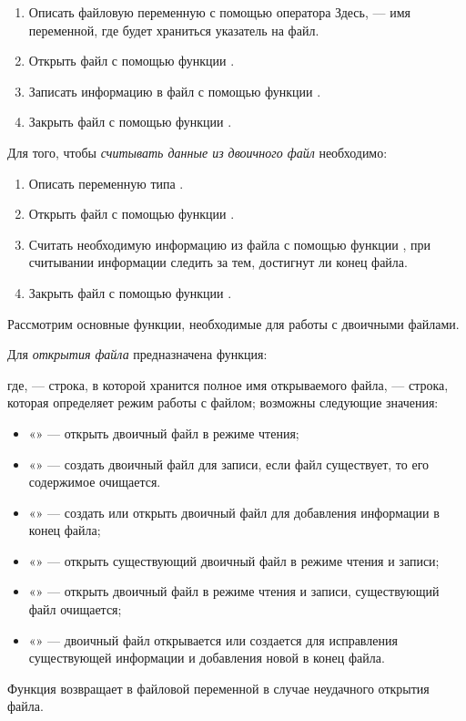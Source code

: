 \begin{enumerate}
\item Описать файловую переменную с помощью оператора
Здесь,  --- имя переменной, где будет храниться указатель на файл.
\item Открыть файл с помощью функции .
\item Записать информацию в файл с помощью функции .
\item Закрыть файл с помощью функции .
\end{enumerate}
Для того, чтобы \emph{считывать данные из двоичного файл} необходимо:

\begin{enumerate}
\item Описать переменную типа .
\item Открыть файл с помощью функции .
\item Считать необходимую информацию из файла с помощью функции , при считывании информации
следить за тем, достигнут ли конец файла.
\item Закрыть файл с помощью функции .
\end{enumerate}
Рассмотрим основные функции, необходимые для работы с двоичными файлами.

Для \emph{открытия файла} предназначена функция:

где,  --- строка, в которой хранится полное имя открываемого файла,  ---
строка, которая определяет режим работы с файлом; возможны следующие значения:
\begin{itemize}
\item[] «» --- открыть двоичный файл в режиме чтения;
\item[] «» --- создать двоичный файл для записи, если файл существует, то его содержимое очищается.
\item[] «» --- создать или открыть двоичный файл для добавления информации в конец файла;
\item[] «» --- открыть существующий двоичный файл в режиме чтения и записи;
\item[] «» --- открыть двоичный файл в режиме чтения и записи, существующий файл очищается;
\item[] «» --- двоичный файл открывается или создается для исправления существующей информации и
добавления новой в конец файла.
\end{itemize}
Функция  возвращает в файловой переменной  в случае неудачного открытия файла.

